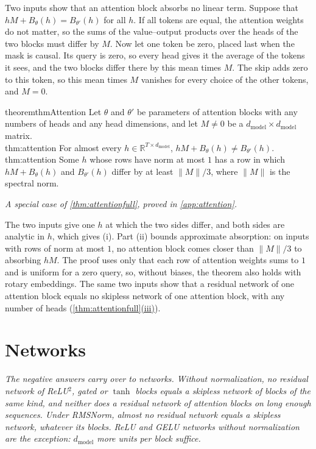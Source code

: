 \documentclass[10pt]{article}
\theoremstyle{definition}
\theoremstyle{remark}
\newcommand{\R}{\mathbb{R}}
\newcommand{\dm}{d_{\mathrm{model}}}
\newcommand{\norm}[1]{\lVert #1\rVert}
\newcommand{\takeaway}[1]{\noindent\textit{#1}\par\smallskip}
\newcommand{\ptlabel}[1]{\phantomsection\label{#1}}
\DeclareRobustCommand{\cpref}[2]{\hyperref[#1:#2]{\cref*{#1}(#2)}}
\newcommand{\specialof}[2]{\par\vspace{-0.4\baselineskip}\noindent\hfill{\small\itshape A special case of \cref{#1}, proved in \cref{#2}.}\par\smallskip}
\newcommand{\stpart}[3]{\ifx\relax#1\relax\else\ptlabel{#1:#2}\fi{\upshape\bfseries\boldmath(#2)\ifx\relax#3\relax\else\ #3.\fi}}
\begin{document}
Two inputs show that an attention block absorbs no linear term. Suppose that $hM + B_\theta(h) = B_{\theta'}(h)$ for all $h$. If all tokens are equal, the attention weights do not matter, so the sums of the value--output products over the heads of the two blocks must differ by $M$. Now let one token be zero, placed last when the mask is causal. Its query is zero, so every head gives it the average of the tokens it sees, and the two blocks differ there by this mean times $M$. The skip adds zero to this token, so this mean times $M$ vanishes for every choice of the other tokens, and $M = 0$.

\begin{restatable}{theorem}{thmAttention}\label{thm:attention}
Let $\theta$ and $\theta'$ be parameters of attention blocks with any numbers of heads and any head dimensions, and let $M \neq 0$ be a $\dm\times\dm$ matrix.\\
\stpart{thm:attention}{i}{} For almost every $h \in \R^{T\times\dm}$, $hM + B_\theta(h) \neq B_{\theta'}(h)$.\\
\stpart{thm:attention}{ii}{} Some $h$ whose rows have norm at most $1$ has a row in which $hM + B_\theta(h)$ and $B_{\theta'}(h)$ differ by at least $\norm{M}/3$, where $\norm{M}$ is the spectral norm.
\end{restatable}
\specialof{thm:attentionfull}{app:attention}

The two inputs give one $h$ at which the two sides differ, and both sides are analytic in $h$, which gives (i). Part (ii) bounds approximate absorption: on inputs with rows of norm at most $1$, no attention block comes closer than $\norm{M}/3$ to absorbing $hM$. The proof uses only that each row of attention weights sums to $1$ and is uniform for a zero query, so, without biases, the theorem also holds with rotary embeddings. The same two inputs show that a residual network of one attention block equals no skipless network of one attention block, with any number of heads (\cpref{thm:attentionfull}{iii}).

\section{Networks}\label{sec:networks}
\takeaway{The negative answers carry over to networks. Without normalization, no residual network of ReLU$^2$, gated or $\tanh$ blocks equals a skipless network of blocks of the same kind, and neither does a residual network of attention blocks on long enough sequences. Under RMSNorm, almost no residual network equals a skipless network, whatever its blocks. ReLU and GELU networks without normalization are the exception: $\dm$ more units per block suffice.}
\end{document}
